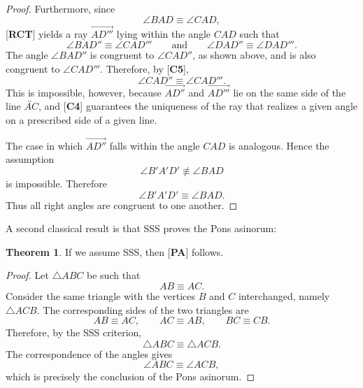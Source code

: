 \documentclass[11pt,a4paper]{article}
\theoremstyle{definition}
\newtheorem{thm}{Theorem}[section]
\theoremstyle{remark}
\numberwithin{equation}{section}
\begin{document}
\begin{proof}
Furthermore, since
\begin{equation*}
\angle BAD\equiv\angle CAD,
\end{equation*}
[\textbf{RCT}] yields a ray $\overrightarrow{AD'''}$ lying within the angle $CAD$ such that
\begin{equation*}
\angle BAD''\equiv\angle CAD'''
\qquad\text{and}\qquad
\angle DAD''\equiv\angle DAD'''.
\end{equation*}
The angle $\angle BAD''$ is congruent to $\angle CAD''$, as shown above, and is also congruent to $\angle CAD'''$. Therefore, by [\textbf{C5}],
\begin{equation*}
\angle CAD''\equiv\angle CAD'''.
\end{equation*}
This is impossible, however, because $\overrightarrow{AD''}$ and $\overrightarrow{AD'''}$ lie on the same side of the line $\overleftrightarrow{AC}$, and [\textbf{C4}] guarantees the uniqueness of the ray that realizes a given angle on a prescribed side of a given line.

The case in which $\overrightarrow{AD''}$ falls within the angle $CAD$ is analogous. Hence the assumption
\begin{equation*}
\angle B'A'D'\not\equiv\angle BAD
\end{equation*}
is impossible. Therefore
\begin{equation*}
\angle B'A'D'\equiv\angle BAD.
\end{equation*}
Thus all right angles are congruent to one another.
\end{proof}
A second classical result is that SSS proves the Pons asinorum:
\begin{thm}\label{PEN_LLL_PA} If we assume SSS, then [\textbf{PA}] follows.
\end{thm}
\begin{proof}
Let $\triangle ABC$ be such that
\begin{equation*}
AB\equiv AC.
\end{equation*}
Consider the same triangle with the vertices $B$ and $C$ interchanged,
namely $\triangle ACB$. The corresponding sides of the two triangles are
\begin{equation*}
AB\equiv AC,\qquad AC\equiv AB,\qquad BC\equiv CB.
\end{equation*}
Therefore, by the SSS criterion,
\begin{equation*}
\triangle ABC\equiv\triangle ACB.
\end{equation*}
The correspondence of the angles gives
\begin{equation*}
\angle ABC\equiv\angle ACB,
\end{equation*}
which is precisely the conclusion of the Pons asinorum.
\end{proof}
\end{document}
